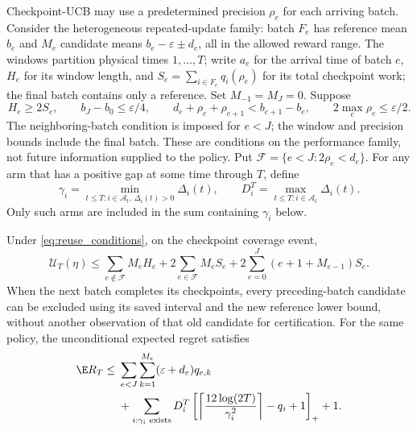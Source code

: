 Checkpoint-UCB may use a predetermined precision $\rho_e$ for each arriving
batch. Consider the heterogeneous repeated-update family: batch $F_e$ has
reference mean $b_e$ and $M_e$ candidate means
$b_e-\varepsilon\pm d_e$, all in the allowed reward range. The windows
partition physical times $1,\ldots,T$; write $a_e$ for the arrival time of
batch $e$, $H_e$ for its window length, and
$S_e=\sum_{i\in F_e}q_i(\rho_e)$ for its total checkpoint work; the final
batch contains only a reference. Set $M_{-1}=M_J=0$. Suppose
\begin{equation}
 H_e\ge2S_e,\qquad b_J-b_0\le\varepsilon/4,\qquad
 d_e+\rho_e+\rho_{e+1}<b_{e+1}-b_e,\qquad
 2\max_e\rho_e\le\varepsilon/2.
 \label{eq:reuse_conditions}
\end{equation}
The neighboring-batch condition is imposed for $e<J$; the window and
precision bounds include the final batch. These are conditions on the
performance family, not future information supplied to the policy. Put
$\mathcal F=\{e<J:2\rho_e<d_e\}$. For any arm that has a positive gap at
some time through $T$, define
\[
 \gamma_i=\min_{t\le T:i\in\mathcal A_t,\,\Delta_i(t)>0}\Delta_i(t),
 \qquad
 D_i^T=\max_{t\le T:i\in\mathcal A_t}\Delta_i(t).
\]
Only such arms are included in the sum containing $\gamma_i$ below.

\begin{proposition}
\label{thm:reuse}
Under \eqref{eq:reuse_conditions}, on the checkpoint coverage event,
\begin{equation}
 \mathcal U_T(\eta)\le
 \sum_{e\notin\mathcal F}M_eH_e+
 2\sum_{e\in\mathcal F}M_eS_e+
 2\sum_{e=0}^J(e+1+M_{e-1})S_e.
 \label{eq:reuse_area}
\end{equation}
When the next batch completes its checkpoints, every preceding-batch candidate
can be excluded using its saved interval and the new reference lower bound,
without another observation of that old candidate for certification.
For the same policy, the unconditional expected regret satisfies
\begin{equation}
 \begin{aligned}
 \E R_T\le{}&\sum_{e<J}\sum_{k=1}^{M_e}(\varepsilon+d_e)q_{e,k}\\
 &+\sum_{i:\gamma_i\text{ exists}}D_i^T
 \left[\left\lceil\frac{12\log(2T)}{\gamma_i^2}\right\rceil-q_i+1\right]_+
 +1.
 \end{aligned}
 \label{eq:reuse_regret}
\end{equation}
\end{proposition}

